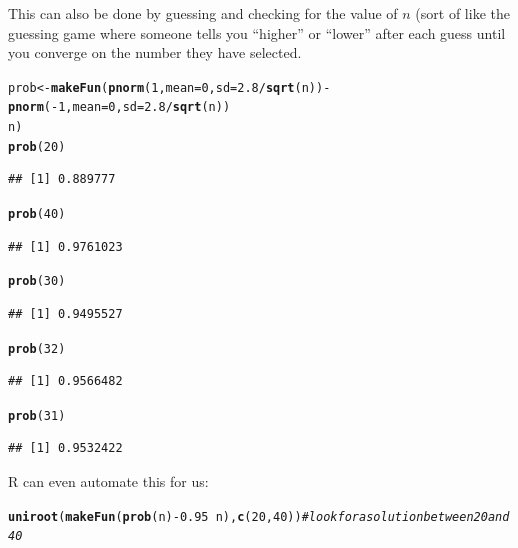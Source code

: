 \documentclass[twoside]{book}\usepackage[]{graphicx}\usepackage[]{xcolor}
\makeatletter
\newcommand{\hlnum}[1]{\textcolor[rgb]{0.686,0.059,0.569}{#1}}%
\newcommand{\hlcom}[1]{\textcolor[rgb]{0.678,0.584,0.686}{\textit{#1}}}%
\newcommand{\hlopt}[1]{\textcolor[rgb]{0,0,0}{#1}}%
\newcommand{\hlstd}[1]{\textcolor[rgb]{0.345,0.345,0.345}{#1}}%
\newcommand{\hlkwb}[1]{\textcolor[rgb]{0.69,0.353,0.396}{#1}}%
\newcommand{\hlkwc}[1]{\textcolor[rgb]{0.333,0.667,0.333}{#1}}%
\newcommand{\hlkwd}[1]{\textcolor[rgb]{0.737,0.353,0.396}{\textbf{#1}}}%
\newenvironment{kframe}{%
 \def\at@end@of@kframe{}%
 \ifinner\ifhmode%
  \def\at@end@of@kframe{\end{minipage}}%
  \begin{minipage}{\columnwidth}%
 \fi\fi%
 \def\FrameCommand##1{\hskip\@totalleftmargin \hskip-\fboxsep
 \colorbox{shadecolor}{##1}\hskip-\fboxsep
     \hskip-\linewidth \hskip-\@totalleftmargin \hskip\columnwidth}%
 \MakeFramed {\advance\hsize-\width
   \@totalleftmargin\z@ \linewidth\hsize
   \@setminipage}}%
 {\par\unskip\endMakeFramed%
 \at@end@of@kframe}
\newenvironment{knitrout}{}{} %
\makeatother
\begin{document}
\begin{solution}
\begin{enumerate}
			 This can also be done by guessing and checking for the value of $n$ (sort of like the 
			 guessing game where someone tells you ``higher'' or ``lower'' after each guess until 
			 you converge on the number they have selected.
\begin{knitrout}
\color{fgcolor}\begin{kframe}
\begin{alltt}
\hlstd{prob} \hlkwb{<-} \hlkwd{makeFun}\hlstd{(}\hlkwd{pnorm}\hlstd{(}\hlnum{1}\hlstd{,} \hlkwc{mean} \hlstd{=} \hlnum{0}\hlstd{,} \hlkwc{sd} \hlstd{=} \hlnum{2.8}\hlopt{/}\hlkwd{sqrt}\hlstd{(n))} \hlopt{-} \hlkwd{pnorm}\hlstd{(}\hlopt{-}\hlnum{1}\hlstd{,} \hlkwc{mean} \hlstd{=} \hlnum{0}\hlstd{,} \hlkwc{sd} \hlstd{=} \hlnum{2.8}\hlopt{/}\hlkwd{sqrt}\hlstd{(n))} \hlopt{~}
    \hlstd{n)}
\hlkwd{prob}\hlstd{(}\hlnum{20}\hlstd{)}
\end{alltt}
\begin{verbatim}
## [1] 0.889777
\end{verbatim}
\begin{alltt}
\hlkwd{prob}\hlstd{(}\hlnum{40}\hlstd{)}
\end{alltt}
\begin{verbatim}
## [1] 0.9761023
\end{verbatim}
\begin{alltt}
\hlkwd{prob}\hlstd{(}\hlnum{30}\hlstd{)}
\end{alltt}
\begin{verbatim}
## [1] 0.9495527
\end{verbatim}
\begin{alltt}
\hlkwd{prob}\hlstd{(}\hlnum{32}\hlstd{)}
\end{alltt}
\begin{verbatim}
## [1] 0.9566482
\end{verbatim}
\begin{alltt}
\hlkwd{prob}\hlstd{(}\hlnum{31}\hlstd{)}
\end{alltt}
\begin{verbatim}
## [1] 0.9532422
\end{verbatim}
\end{kframe}
\end{knitrout}
R can even automate this for us:
\begin{knitrout}
\color{fgcolor}\begin{kframe}
\begin{alltt}
\hlkwd{uniroot}\hlstd{(}\hlkwd{makeFun}\hlstd{(}\hlkwd{prob}\hlstd{(n)} \hlopt{-} \hlnum{0.95} \hlopt{~} \hlstd{n),} \hlkwd{c}\hlstd{(}\hlnum{20}\hlstd{,} \hlnum{40}\hlstd{))}  \hlcom{# look for a solution between 20 and 40}

\end{alltt}
\end{kframe}
\end{knitrout}
\end{enumerate}
\end{solution}
\end{document}
